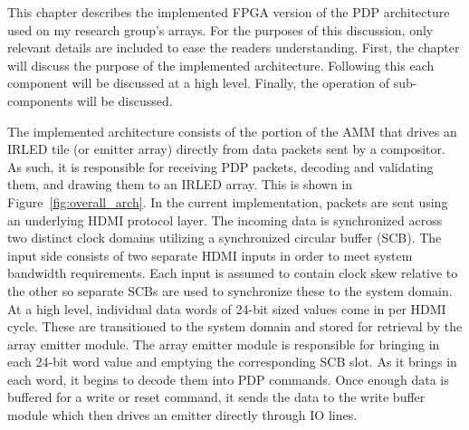 \label{chap:implementation}
This chapter describes the implemented FPGA version of the PDP architecture used on my research group's arrays. For the purposes of this discussion, only relevant details are included to ease the readers understanding. First, the chapter will discuss the purpose of the implemented architecture. Following this each component will be discussed at a high level. Finally, the operation of sub-components will be discussed.

The implemented architecture consists of the portion of the AMM that drives an IRLED tile (or emitter array) directly from data packets sent by a compositor. As such, it is responsible for receiving PDP packets, decoding and validating them, and drawing them to an IRLED array. This is shown in Figure~\ref{fig:overall_arch}. In the current implementation, packets are sent using an underlying HDMI protocol layer. The incoming data is synchronized across two distinct clock domains utilizing a synchronized circular buffer (SCB). The input side consists of two separate HDMI inputs in order to meet system bandwidth requirements. Each input is assumed to contain clock skew relative to the other so separate SCBs are used to synchronize these to the system domain. At a high level, individual data words of 24-bit sized values come in per HDMI cycle. These are transitioned to the system domain and stored for retrieval by the array emitter module. The array emitter module is responsible for bringing in each 24-bit word value and emptying the corresponding SCB slot. As it brings in each word, it begins to decode them into PDP commands. Once enough data is buffered for a write or reset command, it sends the data to the write buffer module which then drives an emitter directly through IO lines.

